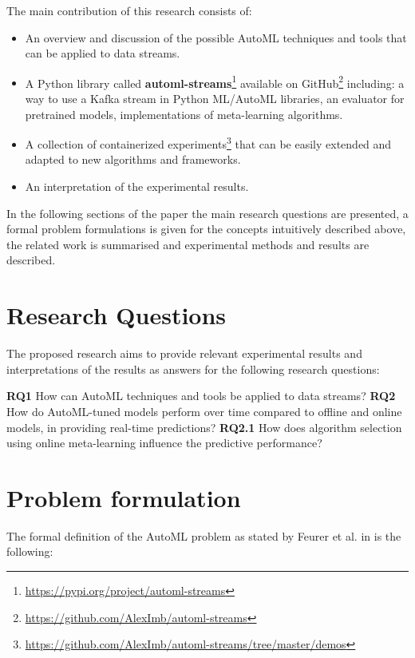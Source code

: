 \documentclass{sig-alternate-br}
\begin{document}
The main contribution of this research consists of:
\begin{itemize}
  \item An overview and discussion of the possible AutoML techniques and tools that can be applied to data streams.
  \item A Python library called \textbf{automl-streams}\footnote{\url{https://pypi.org/project/automl-streams}} available on GitHub\footnote{\url{https://github.com/AlexImb/automl-streams}} including: a way to use a Kafka stream in Python ML/AutoML libraries, an evaluator for pretrained models, implementations of meta-learning algorithms.
  \item A collection of containerized experiments\footnote{\url{https://github.com/AlexImb/automl-streams/tree/master/demos}} that can be easily extended and adapted to new algorithms and frameworks.
  \item An interpretation of the experimental results.
 
\end{itemize}

In the following sections of the paper the main research questions are presented, a formal problem formulations is given for the concepts intuitively described above, the related work is summarised and experimental methods and results are described.

\section{Research Questions}
The proposed research aims to provide relevant experimental results and interpretations of the results as answers for the following research questions: 

\textbf{RQ1} How can AutoML techniques and tools be applied to data streams?
\newline
\newline
\textbf{RQ2} How do AutoML-tuned models perform over time compared to offline and online models, in providing real-time predictions?
		\newline\-\hspace{0.5cm}\textbf{RQ2.1} How does algorithm selection using online meta-learning influence the predictive performance?
    
\section{Problem formulation}
The formal definition of the AutoML problem as stated by Feurer et al. in \cite{feurer2015autosklearn} is the following:
\end{document}
